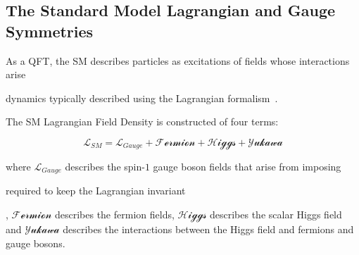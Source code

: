 \begin{table}[htbp]
\label{tab:bosons}
  \centering
\end{table}	

\subsection{The Standard Model Lagrangian and Gauge Symmetries}\label{subsec:gaugeSymmetries}
As a QFT, the SM describes particles as excitations of fields whose interactions arise

dynamics typically described using the Lagrangian formalism~\cite{LagrangiansSM}. 



The SM Lagrangian Field Density is constructed of four terms:

\begin{equation}
\mathcal{L}_{SM} = \mathcal{L}_{Gauge} + \mathcal{Fermion} + \mathcal{Higgs} + \mathcal{Yukawa}
\end{equation}

where $\mathcal{L}_{Gauge}$ describes the spin-$1$ gauge boson fields that arise from imposing 

required to keep the Lagrangian invariant


, $\mathcal{Fermion}$ describes the fermion fields, $\mathcal{Higgs}$ describes the scalar Higgs field and $\mathcal{Yukawa}$ describes the interactions between the Higgs field and fermions and gauge bosons.


